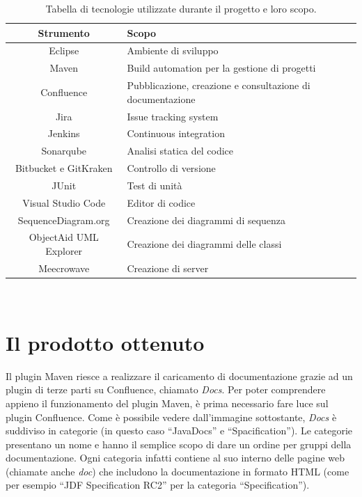         \begin{table}[H]
            {\def\arraystretch{1.5}
            \begin{tabularx}{\textwidth}{c | X}
                \rowcolor{beautyblue}
                \textbf{Strumento} &
                \textbf{Scopo} \\ \hline
                Eclipse & Ambiente di sviluppo \\
                Maven & Build automation per la gestione di progetti \\
                Confluence & Pubblicazione, creazione e consultazione di documentazione \\
                Jira & Issue tracking system \\
                Jenkins & Continuous integration \\
                Sonarqube & Analisi statica del codice \\
                Bitbucket e GitKraken & Controllo di versione \\
                JUnit & Test di unità \\
                Visual Studio Code & Editor di codice \\
                SequenceDiagram.org & Creazione dei diagrammi di sequenza \\
                ObjectAid UML Explorer & Creazione dei diagrammi delle classi \\
                Meecrowave & Creazione di server \\
            \end{tabularx}} \\
        \caption{Tabella di tecnologie utilizzate durante il progetto e loro scopo.}
        \end{table}


\section{Il prodotto ottenuto}
Il plugin Maven riesce a realizzare il caricamento di documentazione grazie ad un plugin di terze parti su Confluence, chiamato \emph{Docs}.
Per poter comprendere appieno il funzionamento del plugin Maven, è prima necessario fare luce sul plugin Confluence.
Come è possibile vedere dall'immagine sottostante, \emph{Docs} è suddiviso in categorie (in questo caso ``JavaDocs'' e ``Spacification'').
Le categorie presentano un nome e hanno il semplice scopo di dare un ordine per gruppi della documentazione.
Ogni categoria infatti contiene al suo interno delle pagine web (chiamate anche \emph{doc}) che includono la documentazione in formato HTML (come per esempio ``JDF Specification RC2'' per la categoria ``Specification'').

